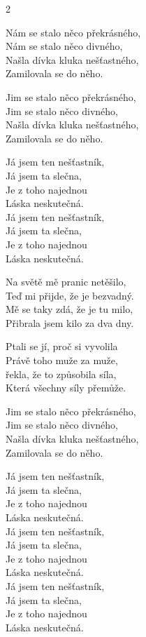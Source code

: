 \begin{multicols}{2}

\ve{}
Nám se stalo něco překrásného,\\
Nám se stalo něco divného,\\
Našla dívka kluka nešťastného,\\
Zamilovala se do něho.

\ve{}
Jim se stalo něco překrásného,\\
Jim se stalo něco divného,\\
Našla dívka kluka nešťastného,\\
Zamilovala se do něho.


\cho{}
Já jsem ten nešťastník,\\
Já jsem ta slečna,\\
Je z toho najednou\\
Láska neskutečná.\\
Já jsem ten nešťastník,\\
Já jsem ta slečna,\\
Je z toho najednou\\
Láska neskutečná.

\ve{}
Na světě mě pranic netěšilo,\\
Teď mi přijde, že je bezvadný.\\
Mě se taky zdá, že je tu milo,\\
Přibrala jsem kilo za dva dny.

\ve{}
Ptali se jí, proč si vyvolila\\
Právě toho muže za muže,\\
řekla, že to způsobila síla,\\
Která všechny síly přemůže.

\vfill\columnbreak\vspace*{\fill}

\ve
Jim se stalo něco překrásného,\\
Jim se stalo něco divného,\\
Našla dívka kluka nešťastného,\\
Zamilovala se do něho.

\cho{}
Já jsem ten nešťastník,\\
Já jsem ta slečna,\\
Je z toho najednou\\
Láska neskutečná.\\
Já jsem ten nešťastník,\\
Já jsem ta slečna,\\
Je z toho najednou\\
Láska neskutečná.\\
Já jsem ten nešťastník,\\
Já jsem ta slečna,\\
Je z toho najednou\\
Láska neskutečná.\\

\end{multicols}
\esong{}